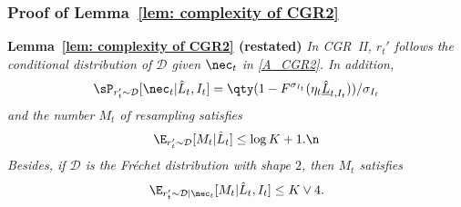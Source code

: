 \subsubsection{Proof of Lemma~\ref{lem: complexity of CGR2}}\label{subsection:proof_cgr2}
\textbf{Lemma~\ref{lem: complexity of CGR2} (restated)} 
\textit{In CGR~II, $r_t'$ follows the conditional distribution of $\mathcal{D}$ given $\nec_t$ in \eqref{A_CGR2}. In addition,}
\begin{align*}
    \sP_{r_t' \sim \mathcal{D}}[\nec_t|\hat{L}_t,I_t]=\qty(1-F^{\sigma_{I_t}}(\eta_t\underline{\hat{L}}_{t,I_t}))/\sigma_{I_t}
\end{align*} 
\textit{and the number $M_t$ of resampling satisfies}
\begin{align}
    \E_{r_t' \sim \mathcal{D}}[M_t|\hat{L}_t]\leq\log K+1.\n
\end{align}
\textit{Besides, if $\mathcal{D}$ is the Fr\'{e}chet distribution with shape $2$, then $M_t$ satisfies}
\begin{align*}
    \E_{r_t' \sim \mathcal{D}|\nec_t}[M_t|\hat{L}_t,I_t]\leq K\lor 4.
\end{align*}

